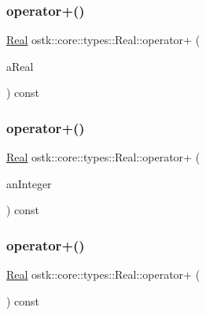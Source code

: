 \mbox{\label{classostk_1_1core_1_1types_1_1_real_ad6ff809c1e808f2fb01ffb92cb6f523e}} 
\subsubsection{\texorpdfstring{operator+()}{operator+()}\hspace{0.1cm}{\footnotesize\ttfamily [2/4]}}
{\footnotesize\ttfamily \hyperlink{classostk_1_1core_1_1types_1_1_real}{Real} ostk\+::core\+::types\+::\+Real\+::operator+ (\begin{DoxyParamCaption}\item[{const \hyperlink{classostk_1_1core_1_1types_1_1_real_aa26f796c30b514c98d573f82e3b02296}{Real\+::\+Value\+Type} \&}]{a\+Real }\end{DoxyParamCaption}) const}

\mbox{\label{classostk_1_1core_1_1types_1_1_real_a4c20cd23544cc727a64db24195b4478b}} 
\subsubsection{\texorpdfstring{operator+()}{operator+()}\hspace{0.1cm}{\footnotesize\ttfamily [3/4]}}
{\footnotesize\ttfamily \hyperlink{classostk_1_1core_1_1types_1_1_real}{Real} ostk\+::core\+::types\+::\+Real\+::operator+ (\begin{DoxyParamCaption}\item[{const \hyperlink{classostk_1_1core_1_1types_1_1_integer}{Integer} \&}]{an\+Integer }\end{DoxyParamCaption}) const}

\mbox{\label{classostk_1_1core_1_1types_1_1_real_a65959c19e50424f370c66fa41464b446}} 
\subsubsection{\texorpdfstring{operator+()}{operator+()}\hspace{0.1cm}{\footnotesize\ttfamily [4/4]}}
{\footnotesize\ttfamily \hyperlink{classostk_1_1core_1_1types_1_1_real}{Real} ostk\+::core\+::types\+::\+Real\+::operator+ (\begin{DoxyParamCaption}{ }\end{DoxyParamCaption}) const}

